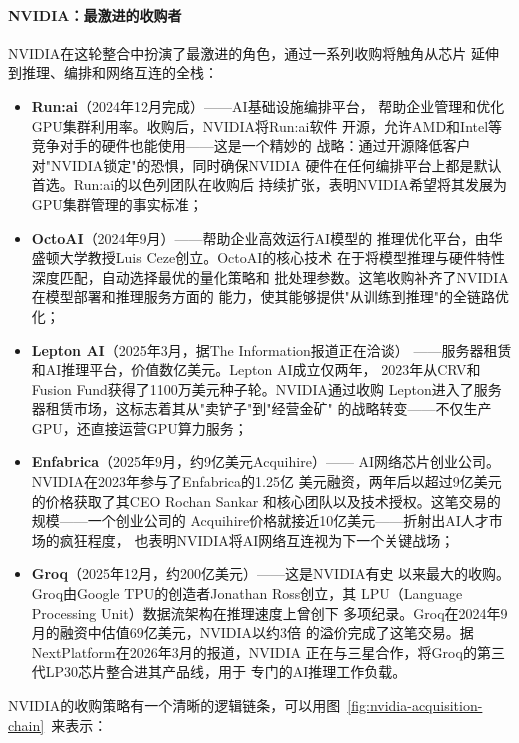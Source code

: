 \paragraph{NVIDIA：最激进的收购者}
NVIDIA在这轮整合中扮演了最激进的角色，通过一系列收购将触角从芯片
延伸到推理、编排和网络互连的全栈：

\begin{itemize}
  \item \textbf{Run:ai}（2024年12月完成）——AI基础设施编排平台，
    帮助企业管理和优化GPU集群利用率。收购后，NVIDIA将Run:ai软件
    开源，允许AMD和Intel等竞争对手的硬件也能使用——这是一个精妙的
    战略：通过开源降低客户对"NVIDIA锁定"的恐惧，同时确保NVIDIA
    硬件在任何编排平台上都是默认首选。Run:ai的以色列团队在收购后
    持续扩张，表明NVIDIA希望将其发展为GPU集群管理的事实标准；
  \item \textbf{OctoAI}（2024年9月）——帮助企业高效运行AI模型的
    推理优化平台，由华盛顿大学教授Luis Ceze创立。OctoAI的核心技术
    在于将模型推理与硬件特性深度匹配，自动选择最优的量化策略和
    批处理参数。这笔收购补齐了NVIDIA在模型部署和推理服务方面的
    能力，使其能够提供"从训练到推理"的全链路优化；
  \item \textbf{Lepton AI}（2025年3月，据The Information报道正在洽谈）
    ——服务器租赁和AI推理平台，价值数亿美元。Lepton AI成立仅两年，
    2023年从CRV和Fusion Fund获得了1100万美元种子轮。NVIDIA通过收购
    Lepton进入了服务器租赁市场，这标志着其从"卖铲子"到"经营金矿"
    的战略转变——不仅生产GPU，还直接运营GPU算力服务；
  \item \textbf{Enfabrica}（2025年9月，约9亿美元Acquihire）——
    AI网络芯片创业公司。NVIDIA在2023年参与了Enfabrica的1.25亿
    美元融资，两年后以超过9亿美元的价格获取了其CEO Rochan Sankar
    和核心团队以及技术授权。这笔交易的规模——一个创业公司的
    Acquihire价格就接近10亿美元——折射出AI人才市场的疯狂程度，
    也表明NVIDIA将AI网络互连视为下一个关键战场；
  \item \textbf{Groq}（2025年12月，约200亿美元）——这是NVIDIA有史
    以来最大的收购。Groq由Google TPU的创造者Jonathan Ross创立，其
    LPU（Language Processing Unit）数据流架构在推理速度上曾创下
    多项纪录。Groq在2024年9月的融资中估值69亿美元，NVIDIA以约3倍
    的溢价完成了这笔交易。据NextPlatform在2026年3月的报道，NVIDIA
    正在与三星合作，将Groq的第三代LP30芯片整合进其产品线，用于
    专门的AI推理工作负载。
\end{itemize}

NVIDIA的收购策略有一个清晰的逻辑链条，可以用图~\ref{fig:nvidia-acquisition-chain}~来表示：

